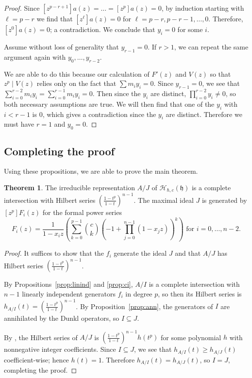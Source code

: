 \documentclass{amsart}
\numberwithin{equation}{section}
\theoremstyle{definition}
\newtheorem{theorem}[equation]{Theorem}
\newcommand{\h}{\mathfrak{h}}
\newcommand{\HH}{\mathcal{H}}
\begin{document}
\begin{proof}
Since $[z^{p-r+1}]a(z)=\dots=[z^p]a(z)=0$, by induction starting with $\ell=p-r$ we find that $[z^\ell]a(z)=0$ for $\ell=p-r,p-r-1,\dots,0$. Therefore, $[z^0]a(z)=0$; a contradiction. We conclude that $y_i=0$ for some $i$.

Assume without loss of generality that $y_{r-1}=0$. If $r>1$, we can repeat the same argument again with $y_0,\dots,y_{r-2}$. 

We are able to do this because our calculation of $F'(z)$ and $V(z)$ so that $z^p \mid V(z)$ relies only on the fact that $\sum m_iy_i=0$. Since $y_{r-1}=0$, we see that $\sum_{i=0}^{r-2}m_iy_i=\sum_{i=0}^{r-1}m_iy_i=0$. Then since the $y_i$ are distinct, $\prod_{i=0}^{r-2} y_i \ne 0$, so both necessary assumptions are true. We will then find that one of the $y_i$ with $i < r-1$ is $0$, which gives a contradiction since the $y_i$ are distinct. Therefore we must have $r=1$ and $y_0=0$. 
\end{proof}

\subsection{Completing the proof}

Using these propositions, we are able to prove the main theorem.

\begin{theorem}\label{thm:main} The irreducible representation $A/J$  of $\HH_{\hbar,c}(\h)$ is a complete intersection with  Hilbert series $\left(\frac{1-t^p}{1-t}\right)^{n-1}$. The maximal ideal $J$ is generated by $[z^p]F_i(z)$ for the formal power series
\[
F_i(z)=\frac{1}{1-x_iz} \left( \sum_{k=0}^{p-1} \binom{c}{k}(-1+\prod_{j=0}^{n-1} (1-x_jz))^k\right) \text{ for $i=0,\dots,n-2$}.
\]
\end{theorem}
\begin{proof}
It suffices to show that the $f_i$ generate the ideal $J$ and that $A/J$ has Hilbert series $\left(\frac{1-t^p}{1-t}\right)^{n-1}$. 

By Propositions~\ref{prop:linind} and \ref{prop:ci}, $A/I$ is a complete intersection with $n-1$ linearly independent generators $f_i$ in degree $p$, so then its Hilbert series is $h_{A/I}(t)=\left(\frac{1-t^p}{1-t}\right)^{n-1}$. By Proposition~\ref{prop:ann}, the generators of $I$ are annihilated by the Dunkl operators, so $I \subseteq J$.

By \cite[Proposition 3.4]{BC1}, the Hilbert series of $A/J$ is $\left(\frac{1-t^p}{1-t}\right)^{n-1}h(t^p)$ for some polynomial $h$ with nonnegative integer coefficients. Since $I \subseteq J$, we see that $h_{A/I}(t) \ge h_{A/J}(t)$ coefficient-wise; hence $h(t)=1$. Therefore $h_{A/I}(t)=h_{A/J}(t)$, so $I=J$, completing the proof.
\end{proof}



\end{document}

